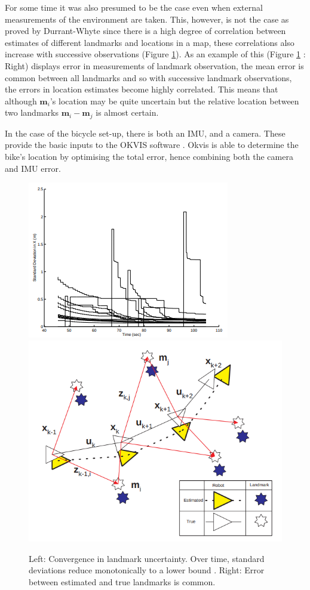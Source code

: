 \documentclass[11pt,twoside]{report}
\begin{document}
For some time it was also presumed to be the case even when external measurements of the environment are taken. This, however, is not the case as proved by Durrant-Whyte \cite{F_Durr_1} since there is a high degree of correlation between estimates of different landmarks and locations in a map, these correlations also increase with successive observations (Figure \ref{slam_prob_fig}). As an example of this (Figure \ref{slam_prob_fig} : Right) displays error in measurements of landmark observation, the mean error is common between all landmarks and so with successive landmark observations, the errors in location estimates become highly correlated. This means that although $\textbf{m}_{i}$'s location may be quite uncertain but the relative location between two landmarks $\textbf{m}_{i}-\textbf{m}_{j}$ is almost certain.\newline\newline 

In the case of the bicycle set-up, there is both an IMU, and a camera. These provide the basic inputs to the OKVIS software \cite{Okvis_1}. Okvis is able to determine the bike's location by optimising the total error, hence combining both the camera and IMU error.

\noindent \begin{figure}[h!]
	\includegraphics[width = 0.5\hsize]{figures/convergence_landmark_uncertainty.png}
	\includegraphics[width = 0.5\hsize]{figures/ess_slam.png}
	\caption{Left: Convergence in landmark uncertainty.  Over time, standard deviations reduce monotonically to a lower bound \cite{F_Durr_Pt1}. Right: Error between estimated and true landmarks is common.}
	\label{slam_prob_fig}
\end{figure}
\end{document}
